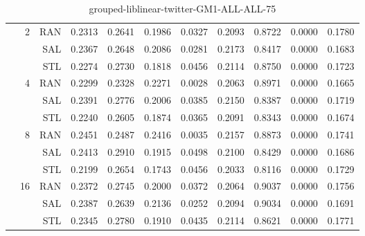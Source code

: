 \begin{center}
\begin{table}[htbp]
\begin{center}
\begin{tabular}{ | r | r | r | r | r | r | r | r | r | r | r |}
 & \multirow{3}{*}{2} & RAN & 0.2313 & 0.2641 & 0.1986 & 0.0327 & 0.2093 & 0.8722 & 0.0000 & 0.1780\\ \cline{3-11}
 &   & SAL & 0.2367 & 0.2648 & 0.2086 & 0.0281 & 0.2173 & 0.8417 & 0.0000 & 0.1683\\ \cline{3-11}
 &   & STL & 0.2274 & 0.2730 & 0.1818 & 0.0456 & 0.2114 & 0.8750 & 0.0000 & 0.1723\\ \cline{2-11}
 & \multirow{3}{*}{4} & RAN & 0.2299 & 0.2328 & 0.2271 & 0.0028 & 0.2063 & 0.8971 & 0.0000 & 0.1665\\ \cline{3-11}
 &   & SAL & 0.2391 & 0.2776 & 0.2006 & 0.0385 & 0.2150 & 0.8387 & 0.0000 & 0.1719\\ \cline{3-11}
 &   & STL & 0.2240 & 0.2605 & 0.1874 & 0.0365 & 0.2091 & 0.8343 & 0.0000 & 0.1674\\ \cline{2-11}
 & \multirow{3}{*}{8} & RAN & 0.2451 & 0.2487 & 0.2416 & 0.0035 & 0.2157 & 0.8873 & 0.0000 & 0.1741\\ \cline{3-11}
 &   & SAL & 0.2413 & 0.2910 & 0.1915 & 0.0498 & 0.2100 & 0.8429 & 0.0000 & 0.1686\\ \cline{3-11}
 &   & STL & 0.2199 & 0.2654 & 0.1743 & 0.0456 & 0.2033 & 0.8116 & 0.0000 & 0.1729\\ \cline{2-11}
 & \multirow{3}{*}{16} & RAN & 0.2372 & 0.2745 & 0.2000 & 0.0372 & 0.2064 & 0.9037 & 0.0000 & 0.1756\\ \cline{3-11}
 &   & SAL & 0.2387 & 0.2639 & 0.2136 & 0.0252 & 0.2094 & 0.9034 & 0.0000 & 0.1691\\ \cline{3-11}
 &   & STL & 0.2345 & 0.2780 & 0.1910 & 0.0435 & 0.2114 & 0.8621 & 0.0000 & 0.1771\\ \cline{2-11}
\hline
\end{tabular}
\caption{grouped-liblinear-twitter-GM1-ALL-ALL-75}
\end{center}
 \end{table}
\end{center}

